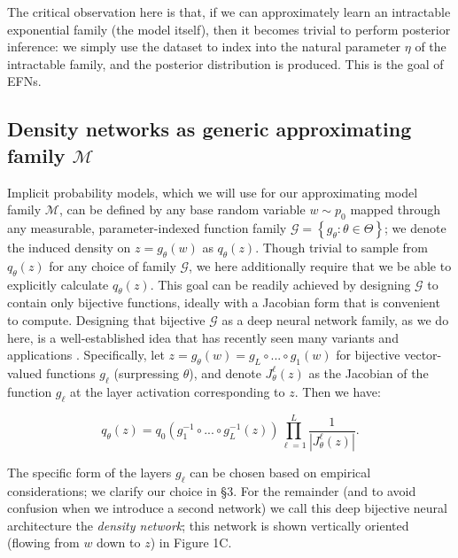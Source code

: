 \documentclass[twoside]{article}
\begin{document}
The critical observation here is that, if we can approximately learn an intractable exponential family (the model itself), then it becomes trivial to perform posterior inference: we simply use the dataset to index into the natural parameter $\eta$ of the intractable family, and the posterior distribution is produced.  This is the goal of EFNs.

\subsection{Density networks as generic approximating family $\mathcal{M}$}

Implicit probability models, which we will use for our approximating model family $\mathcal{M}$, can be defined by any base random variable $w\sim p_0$ mapped through any measurable, parameter-indexed function family  $\mathcal{G} = \left\{g_\theta: \theta \in \Theta\right\}$; we denote the induced density on $z=g_\theta(w)$ as $q_\theta(z)$.   
Though trivial to sample from $q_\theta(z)$ for any choice of family $\mathcal{G}$, we here additionally require that we be able to explicitly calculate $q_\theta(z)$.  
This goal can be readily achieved by designing $\mathcal{G}$ to contain only bijective functions, ideally with a Jacobian form that is convenient to compute. %
Designing that bijective $\mathcal{G}$ as a deep neural network family, as we do here, is a well-established idea that has recently seen many variants and applications \citep{mackay1997density, baird2005one, tabak2010density, rippel2013high, uria2013rnade, rezende2015variational, dinh2016density, papamakarios2017masked, jacobsen2018revnet}.  Specifically, let $z = g_\theta(w) = g_L \circ ... \circ g_1(w)$ for bijective vector-valued functions $g_\ell$ (surpressing $\theta$), and denote $J^\ell_\theta(z)$ as the Jacobian of the function $g_\ell$ at the layer activation corresponding to $z$.  Then we have:

%
{\small 
\begin{equation}
q_\theta(z) = q_0\left( g_1^{-1} \circ ... \circ g_L^{-1}(z) \right) \prod_{\ell=1}^L \frac{1}{| J^\ell_\theta(z) |}.
\label{eq:4}
\end{equation}}

%
The specific form of the layers $g_\ell$ can be chosen based on empirical considerations; we clarify our choice in \S3.  For the remainder (and to avoid confusion when we introduce a second network) we call this deep bijective neural architecture the \emph{density network}; this network is shown vertically oriented (flowing from $w$ down to $z$) in Figure 1C.
\end{document}
